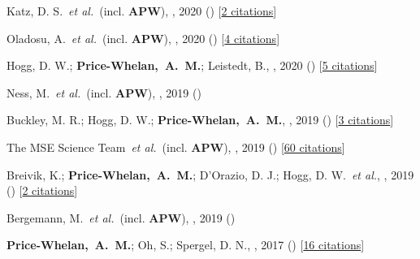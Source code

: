 \item[{\color{deemph}\scriptsize9}]Katz, D. S.~\textit{et al.}~(incl. \textbf{APW}), , 2020 () [\href{http://adsabs.harvard.edu/abs/2020arXiv201005102K}{2 citations}]

\item[{\color{deemph}\scriptsize8}]Oladosu, A.~\textit{et al.}~(incl. \textbf{APW}), , 2020 () [\href{http://adsabs.harvard.edu/abs/2020arXiv200704459O}{4 citations}]

\item[{\color{deemph}\scriptsize7}]Hogg, D. W.; \textbf{Price-Whelan,~A.~M.}; Leistedt, B., , 2020 () [\href{http://adsabs.harvard.edu/abs/2020arXiv200514199H}{5 citations}]

\item[{\color{deemph}\scriptsize6}]Ness, M.~\textit{et al.}~(incl. \textbf{APW}), , 2019 ()

\item[{\color{deemph}\scriptsize5}]Buckley, M. R.; Hogg, D. W.; \textbf{Price-Whelan,~A.~M.}, , 2019 () [\href{http://adsabs.harvard.edu/abs/2019arXiv190700987B}{3 citations}]

\item[{\color{deemph}\scriptsize4}]The MSE Science Team~\textit{et al.}~(incl. \textbf{APW}), , 2019 () [\href{http://adsabs.harvard.edu/abs/2019arXiv190404907T}{60 citations}]

\item[{\color{deemph}\scriptsize3}]Breivik, K.; \textbf{Price-Whelan,~A.~M.}; D'Orazio, D. J.; Hogg, D. W.~\textit{et al.}, , 2019 () [\href{http://adsabs.harvard.edu/abs/2019arXiv190305094B}{2 citations}]

\item[{\color{deemph}\scriptsize2}]Bergemann, M.~\textit{et al.}~(incl. \textbf{APW}), , 2019 ()

\item[{\color{deemph}\scriptsize1}]\textbf{Price-Whelan,~A.~M.}; Oh, S.; Spergel, D. N., , 2017 () [\href{http://adsabs.harvard.edu/abs/2017arXiv170903532P}{16 citations}]